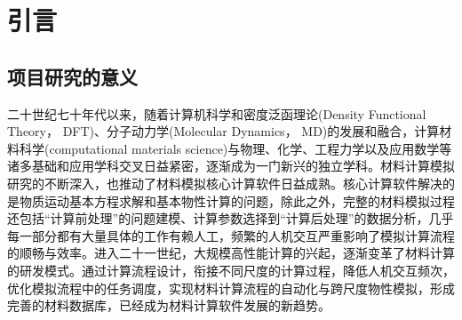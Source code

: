 \chapter{引言} \label{chap:intro}
\section{项目研究的意义}
二十世纪七十年代以来，随着计算机科学和密度泛函理论\textrm{(Density Functional Theory， DFT)}\cite{PRB136-864_1964,PRA140-1133_1965,Parr-Yang,CR91-651_1991}、分子动力学\textrm{(Molecular Dynamics， MD)}的发展和融合，计算材料科学\textrm{(computational materials science)}与物理、化学、工程力学以及应用数学等诸多基础和应用学科交叉日益紧密，逐渐成为一门新兴的独立学科。\cite{Nat-Mat3-429_2004,App-CataA5-254_2003,JACS125-4306_2003,JCC5-472_2003,Mater_Sci-Tech16-1_2005,Nature392-694_1998}材料计算模拟研究的不断深入，也推动了材料模拟核心计算软件日益成熟。核心计算软件解决的是物质运动基本方程求解和基本物性计算的问题，除此之外，完整的材料模拟过程还包括“计算前处理”的问题建模、计算参数选择到“计算后处理”的数据分析，几乎每一部分都有大量具体的工作有赖人工，频繁的人机交互严重影响了模拟计算流程的顺畅与效率。进入二十一世纪，大规模高性能计算的兴起，逐渐变革了材料计算的研发模式。通过计算流程设计，衔接不同尺度的计算过程，降低人机交互频次，优化模拟流程中的任务调度，实现材料计算流程的自动化与跨尺度物性模拟，形成完善的材料数据库，已经成为材料计算软件发展的新趋势。

